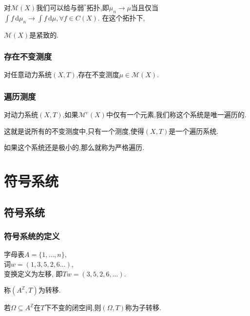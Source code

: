 \documentclass[compress,red]{beamer}
\begin{document}
\begin{frame}
对$\mathcal{M}(X)$我们可以给与弱$^*$拓扑,即$\mu_n\rightarrow \mu$当且仅当$\int\!f \, \mathrm{d}\mu_n\rightarrow \int\!f \, \mathrm{d}\mu,\forall f \in C(X)$.
在这个拓扑下,
\begin{theorem}
$\mathcal{M}(X)$是紧致的.
\end{theorem}

\end{frame}

\begin{frame}
\frametitle{存在不变测度}
\begin{theorem}
对任意动力系统$(X,T)$,存在不变测度$\mu\in\mathcal{M}(X)$.
\end{theorem}
\end{frame}

\begin{frame}
\frametitle{遍历测度}
\begin{definition}
对动力系统$(X,T)$,如果$\mathcal{M}^e(X)$中仅有一个元素,我们称这个系统是唯一遍历的.

\medskip
这就是说所有的不变测度中,只有一个测度,使得$(X,T)$是一个遍历系统.
\pause

\medskip
如果这个系统还是极小的,那么就称为严格遍历.
\end{definition}

\end{frame}


\section{符号系统}
\subsection{符号系统}
\begin{frame}
\frametitle{符号系统的定义}
\begin{example}
字母表$A=\{1,\ldots,n\}$,\\ \pause 
词$w=(1,3,5,2,6\ldots)$,\\ \pause
变换定义为左移, \pause 
即$Tw=(3,5,2,6,\ldots)$.
\end{example}
\pause
\begin{definition}
称$(A^{\mathbb{Z}},T)$为转移.\pause

\medskip 
若$\Omega\subseteq A^{\mathbb{Z}}$在$T$下不变的闭空间,则$(\Omega,T)$称为子转移.
\end{definition}
\end{frame}
\end{document}
